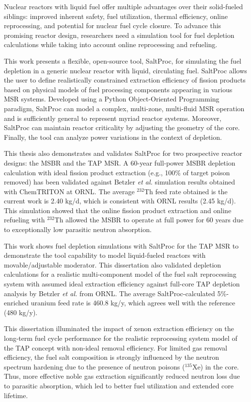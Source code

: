 Nuclear reactors with liquid fuel offer multiple advantages over their 
solid-fueled siblings: improved inherent safety, fuel utilization, thermal
efficiency, online reprocessing, and potential for nuclear fuel cycle closure. 
To advance this promising reactor design, researchers need a simulation tool 
for fuel depletion calculations while taking into account online reprocessing 
and refueling.

This work presents a flexible, open-source tool, SaltProc, for simulating the 
fuel depletion in a generic nuclear reactor with liquid, circulating fuel.
SaltProc allows the user to define realistically constrained extraction 
efficiency of fission products based on physical models of fuel processing 
components appearing in various \gls{MSR} systems.  Developed using a Python 
Object-Oriented Programming paradigm, SaltProc can model a complex, 
multi-zone, multi-fluid \gls{MSR} operation and is sufficiently general to 
represent myriad reactor systems. Moreover, SaltProc can maintain reactor 
criticality by adjusting the geometry of the core.  Finally, the tool can 
analyze power variations in the context of depletion.

This thesis also demonstrates and validates SaltProc for two prospective 
reactor designs: the \gls{MSBR} and the \gls{TAP} \gls{MSR}. A 60-year 
full-power \gls{MSBR} depletion calculation with ideal fission product 
extraction (e.g., 100\% of target poison removed) has been validated against 
Betzler \emph{et al.} simulation results obtained with ChemTRITON at ORNL. The 
average $^{232}$Th feed rate obtained is the current work is 2.40 kg/d, which 
is consistent with ORNL results (2.45 kg/d). This simulation showed that the 
online fission product extraction and online refueling with $^{232}$Th allowed 
the \gls{MSBR} to operate at full power for 60 years due to exceptionally low 
parasitic neutron absorption.

This work shows fuel depletion simulations with SaltProc for the \gls{TAP} 
\gls{MSR} to demonstrate the tool capability to model liquid-fueled reactors 
with movable/adjustable moderator. This dissertation also validated depletion 
calculations for a realistic multi-component model of the fuel salt 
reprocessing system with assumed ideal extraction efficiency against full-core 
\gls{TAP} depletion analysis by Betzler \emph{et al.} from ORNL. The average 
SaltProc-calculated 5\%-enriched uranium feed rate is 460.8 kg/y, which agrees 
well with the reference (480 kg/y). 

This dissertation illuminated the impact of xenon extraction efficiency on the 
long-term fuel cycle performance for the realistic reprocessing system model 
of the TAP concept with non-ideal removal efficiency. For limited gas removal 
efficiency, the fuel salt composition is strongly influenced by the neutron 
spectrum hardening due to the presence of neutron poisons ($^{135}$Xe) in the 
core. Thus, more effective noble gas extraction significantly reduced neutron 
loss due to parasitic absorption, which led to better fuel utilization and 
extended core lifetime. 


